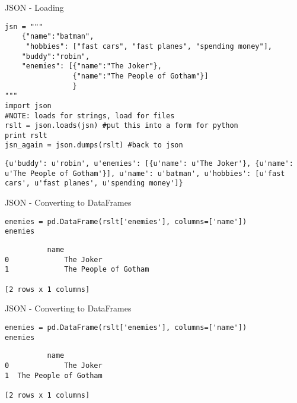 \documentclass[presentation]{beamer}
\begin{document}
\begin{frame}[fragile,label=sec-5-3-1]{JSON - Loading}
 \lstset{numbers=left,language=Python,label= ,caption= }
\begin{lstlisting}
jsn = """
    {"name":"batman",
     "hobbies": ["fast cars", "fast planes", "spending money"],
    "buddy":"robin",
    "enemies": [{"name":"The Joker"},
                {"name":"The People of Gotham"}]
                }
"""
import json
#NOTE: loads for strings, load for files
rslt = json.loads(jsn) #put this into a form for python
print rslt
jsn_again = json.dumps(rslt) #back to json
\end{lstlisting}

\lstset{numbers=left,language=Python,label= ,caption= }
\begin{lstlisting}
{u'buddy': u'robin', u'enemies': [{u'name': u'The Joker'}, {u'name': u'The People of Gotham'}], u'name': u'batman', u'hobbies': [u'fast cars', u'fast planes', u'spending money']}
\end{lstlisting}
\end{frame}


\begin{frame}[fragile,label=sec-5-3-2]{JSON - Converting to DataFrames}
 \lstset{numbers=left,language=Python,label= ,caption= }
\begin{lstlisting}
enemies = pd.DataFrame(rslt['enemies'], columns=['name'])
enemies
\end{lstlisting}

\lstset{numbers=left,language=Python,label= ,caption= }
\begin{lstlisting}
	      name
0             The Joker
1             The People of Gotham

[2 rows x 1 columns]
\end{lstlisting}
\end{frame}


\begin{frame}[fragile,label=sec-5-3-3]{JSON - Converting to DataFrames}
 \lstset{numbers=left,language=Python,label= ,caption= }
\begin{lstlisting}
enemies = pd.DataFrame(rslt['enemies'], columns=['name'])
enemies
\end{lstlisting}

\lstset{numbers=left,language=Python,label= ,caption= }
\begin{lstlisting}
	      name
0             The Joker
1  The People of Gotham

[2 rows x 1 columns]
\end{lstlisting}
\end{frame}
\end{document}
